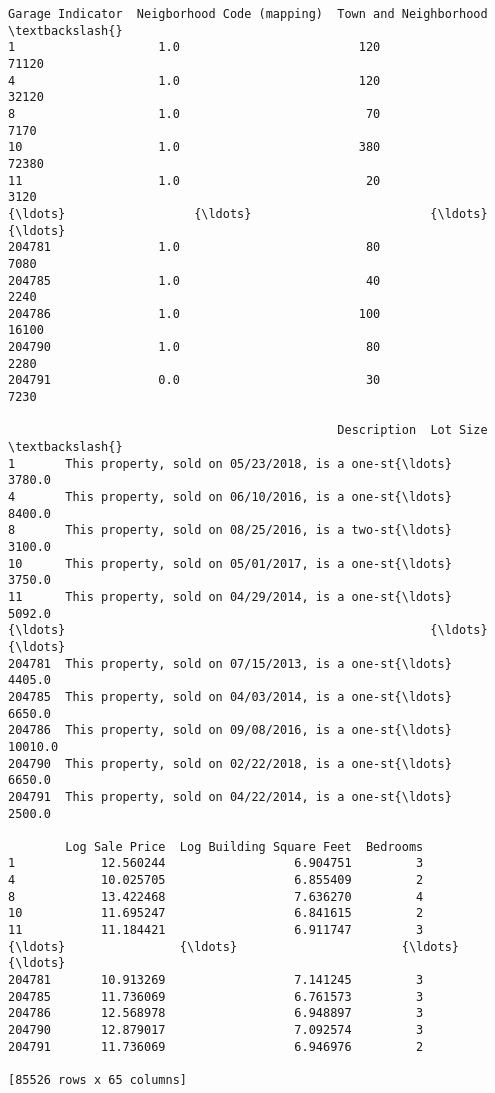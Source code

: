 \documentclass[11pt]{article}
\begin{document}
\begin{tcolorbox}[breakable, size=fbox, boxrule=.5pt, pad at break*=1mm, opacityfill=0]
\begin{Verbatim}[commandchars=\\\{\}]
        Garage Indicator  Neigborhood Code (mapping)  Town and Neighborhood  \textbackslash{}
1                    1.0                         120                  71120
4                    1.0                         120                  32120
8                    1.0                          70                   7170
10                   1.0                         380                  72380
11                   1.0                          20                   3120
{\ldots}                  {\ldots}                         {\ldots}                    {\ldots}
204781               1.0                          80                   7080
204785               1.0                          40                   2240
204786               1.0                         100                  16100
204790               1.0                          80                   2280
204791               0.0                          30                   7230

                                              Description  Lot Size  \textbackslash{}
1       This property, sold on 05/23/2018, is a one-st{\ldots}    3780.0
4       This property, sold on 06/10/2016, is a one-st{\ldots}    8400.0
8       This property, sold on 08/25/2016, is a two-st{\ldots}    3100.0
10      This property, sold on 05/01/2017, is a one-st{\ldots}    3750.0
11      This property, sold on 04/29/2014, is a one-st{\ldots}    5092.0
{\ldots}                                                   {\ldots}       {\ldots}
204781  This property, sold on 07/15/2013, is a one-st{\ldots}    4405.0
204785  This property, sold on 04/03/2014, is a one-st{\ldots}    6650.0
204786  This property, sold on 09/08/2016, is a one-st{\ldots}   10010.0
204790  This property, sold on 02/22/2018, is a one-st{\ldots}    6650.0
204791  This property, sold on 04/22/2014, is a one-st{\ldots}    2500.0

        Log Sale Price  Log Building Square Feet  Bedrooms
1            12.560244                  6.904751         3
4            10.025705                  6.855409         2
8            13.422468                  7.636270         4
10           11.695247                  6.841615         2
11           11.184421                  6.911747         3
{\ldots}                {\ldots}                       {\ldots}       {\ldots}
204781       10.913269                  7.141245         3
204785       11.736069                  6.761573         3
204786       12.568978                  6.948897         3
204790       12.879017                  7.092574         3
204791       11.736069                  6.946976         2

[85526 rows x 65 columns]
\end{Verbatim}
\end{tcolorbox}
        
\end{document}
